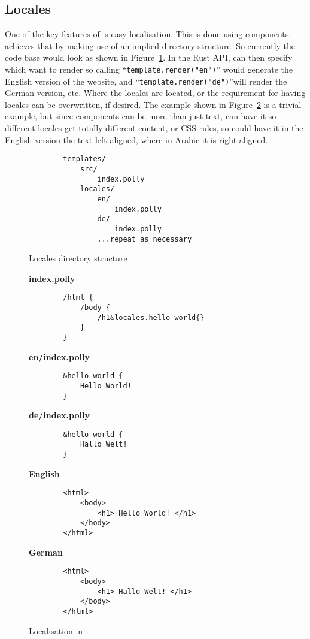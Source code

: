\subsection{Locales}
One of the key features of \languageName{} is easy localisation. This is done using components. \languageName{} achieves that by making use of an implied directory structure. So currently the \languageName{} code base would look as shown in Figure~\ref{fig:directory}. In the Rust API, \you{} can then specify which \you{} want to render so calling ``\verb|template.render("en")|'' would generate the English version of the website, and ``\verb|template.render("de")|''will render the German version, etc. Where the locales are located, or the requirement for having locales can be overwritten, if desired. The example shown in Figure~\ref{fig:pollyLocalisation} is a trivial example, but since components can be more than just text, \you{} can have it so different locales get totally different content, or CSS rules, so \you{} could have it in the English version the text left-aligned, where in Arabic it is right-aligned.

\begin{figure}[!htbp]
    \begin{verbatim}
        templates/
            src/
                index.polly
            locales/
                en/
                    index.polly
                de/
                    index.polly
                ...repeat as necessary
    \end{verbatim}
    \caption{Locales directory structure}
    \label{fig:directory}
\end{figure}

\begin{figure}[!htbp]
    \Large{\textbf{index.polly}}\normalsize{}
    \begin{verbatim}
        /html {
            /body {
                /h1&locales.hello-world{}
            }
        }
    \end{verbatim}
    \Large{\textbf{en/index.polly}}\normalsize{}
    \begin{verbatim}
        &hello-world {
            Hello World!
        }
    \end{verbatim}
    \Large{\textbf{de/index.polly}}\normalsize{}
    \begin{verbatim}
        &hello-world {
            Hallo Welt!
        }
    \end{verbatim}
    \Large{\textbf{English }}\normalsize{}
    \begin{verbatim}
        <html>
            <body>
                <h1> Hello World! </h1>
            </body>
        </html>
    \end{verbatim}
    \Large{\textbf{German }}\normalsize{}
    \begin{verbatim}
        <html>
            <body>
                <h1> Hallo Welt! </h1>
            </body>
        </html>
    \end{verbatim}
    \caption{Localisation in \languageName{}}
    \label{fig:pollyLocalisation}
\end{figure}
\newpage

